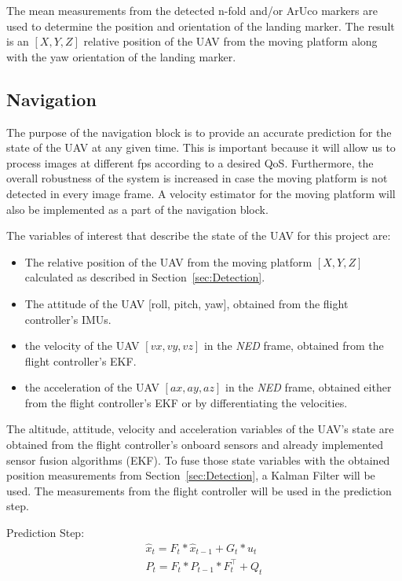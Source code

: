 \documentclass[conference]{IEEEtran}
\begin{document}
%
The mean measurements from the detected n-fold and/or ArUco markers
are used to determine the position and orientation of the landing
marker. The result is an $[X,Y,Z]$ relative position of the UAV from
the moving platform along with the yaw orientation of the landing
marker.


\subsection{Navigation}
\label{sec:Navigation}

The purpose of the navigation block is to provide an accurate
prediction for the state of the UAV at any given time. This is
important because it will allow us to process images at different fps
according to a desired QoS. Furthermore, the overall robustness of the
system is increased in case the moving platform is not detected in
every image frame. A velocity estimator for the moving platform will
also be implemented as a part of the navigation block.

The variables of interest that describe the state of the UAV for this project are:
%
\begin{itemize}

\item The relative position of the UAV from the moving platform $[X,Y,Z]$ calculated as described in Section~\ref{sec:Detection}.

\item The attitude of the UAV [roll, pitch, yaw], obtained from the flight controller's IMUs.

\item the velocity of the UAV $[vx,vy,vz]$ in the \emph{NED} frame, obtained from the flight controller's EKF.

\item the acceleration of the UAV $[ax,ay,az]$ in the \emph{NED} frame, obtained either from the flight controller's EKF or by differentiating the velocities.

\end{itemize}
%
The altitude, attitude, velocity and acceleration variables of the
UAV's state are obtained from the flight controller's onboard sensors
and already implemented sensor fusion algorithms (EKF). To fuse those
state variables with the obtained position measurements from
Section~\ref{sec:Detection}, a Kalman Filter will be used. The
measurements from the flight controller will be used in the prediction
step.

Prediction Step:
\begin{equation} 
 \begin{array}{l}
    \hat{x}_{t} = F_{t} * \hat{x}_{t-1} + G_{t} *u_{t} \\ 
    P_{t} = F_{t}* P_{t-1} * F_{t}^\top + Q_{t}
  \end{array}
\end{equation}
\end{document}
